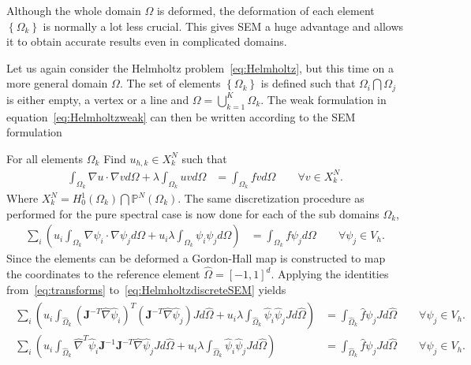 Although the whole domain $\Omega$ is deformed, the deformation of each
element $\left\{ \Omega_k \right\}$ is normally a lot less crucial. This gives SEM a huge advantage and allows it to 
obtain accurate results even in complicated domains.

Let us again consider the Helmholtz problem~\ref{eq:Helmholtz}, but this time 
on a more general domain $\Omega$. The set of elements $\left\{ \Omega_k \right\}$
is defined such that $\Omega_i\bigcap\Omega_j$ is either empty, a vertex or a line and 
$\Omega = \bigcup^K_{k=1}\Omega_k$.
The weak formulation in equation~\ref{eq:Helmholtzweak} can then be written according 
to the SEM formulation

For all elements $\Omega_k$ Find $u_{h,k}\in X^N_k$  such that
%
\begin{align}
    \int_{\Omega_k}\nabla u \cdot \nabla v d \Omega + \lambda \int_{\Omega_k} u vd \Omega 
    &= \int_{\Omega_k}f vd \Omega \qquad \forall v \in X_k^N.
    \label{eq:HelmholtzweakSEM}
\end{align}
%
Where $X^N_k =  H_0^1(\Omega_k)\bigcap\mathbb{P}^N(\Omega_k)$. The same discretization 
procedure as performed for the pure spectral case is now done for each of the 
sub domains $\Omega_k$,
%
\begin{align}
    \sum_i\left(  u_i\int_{\Omega_k}\nabla \psi_i \cdot \nabla \psi_j d \Omega + 
    u_i\lambda \int_{\Omega_k} \psi_i \psi_jd \Omega \right)
    &= \int_{\Omega_k}f \psi_jd \Omega \qquad \forall \psi_j \in V_h.
    \label{eq:HelmholtzdiscreteSEM}
\end{align}
%
Since the elements can be deformed a Gordon-Hall map is 
constructed to map the coordinates to the reference element $\hat{\Omega}=[-1,1]^d$.
Applying the identities from~\ref{eq:transforms} to~\ref{eq:HelmholtzdiscreteSEM} yields
%
\begin{align}
    \begin{split}
    \sum_i\left(  u_i\int_{\hat{\Omega}_k}(\mathbf{J}^{-T}\hat{\nabla} \hat{\psi}_i)^T
    (\mathbf{J}^{-T}\hat{\nabla} \hat{\psi}_j) J d \hat{\Omega} + 
    u_i\lambda \int_{\hat{\Omega}_k} \hat{\psi}_i \hat{\psi}_j Jd \hat{\Omega} \right)
    &= \int_{\hat{\Omega}_k}\hat{f} \psi_j J d \hat{\Omega} \qquad \forall \psi_j \in V_h.  \\
    \sum_i\left(  u_i\int_{\hat{\Omega}_k}\hat{\nabla}^T \hat{\psi}_i\mathbf{J}^{-1}
    \mathbf{J}^{-T}\hat{\nabla} \hat{\psi}_j J d \hat{\Omega} + 
    u_i\lambda \int_{\hat{\Omega}_k} \hat{\psi}_i \hat{\psi}_j Jd \hat{\Omega} \right)
    &= \int_{\hat{\Omega}_k}\hat{f} \psi_j J d \hat{\Omega} \qquad \forall \psi_j \in V_h.
    \end{split}
    \label{eq:HelmholtzrefSEM}
\end{align}
